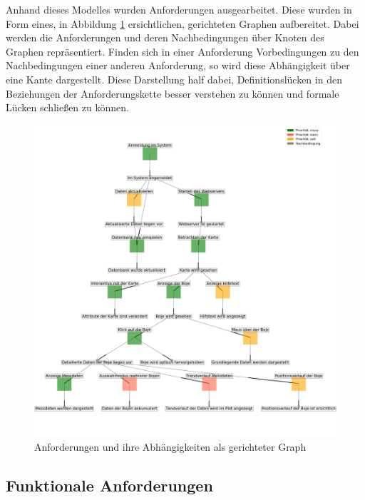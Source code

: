     Anhand dieses Modelles  wurden Anforderungen ausgearbeitet. Diese wurden in Form eines, in Abbildung \ref{fig:graph_anforderungen} ersichtlichen, gerichteten Graphen aufbereitet. Dabei werden die Anforderungen und deren Nachbedingungen über Knoten des Graphen repräsentiert. Finden sich in einer Anforderung Vorbedingungen zu den Nachbedingungen einer anderen Anforderung, so wird diese Abhängigkeit über eine Kante dargestellt. Diese Darstellung half dabei, Definitionslücken in den Beziehungen  der Anforderungskette besser verstehen zu können und formale Lücken schließen zu können.

    \begin{figure}[h!]
    \centering
    \includegraphics[width=\textwidth]{pix/graph_anforderungen.png}
    \caption{Anforderungen und ihre Abhängigkeiten als gerichteter Graph}
    \label{fig:graph_anforderungen}
    \end{figure}


    \subsection{Funktionale Anforderungen}

